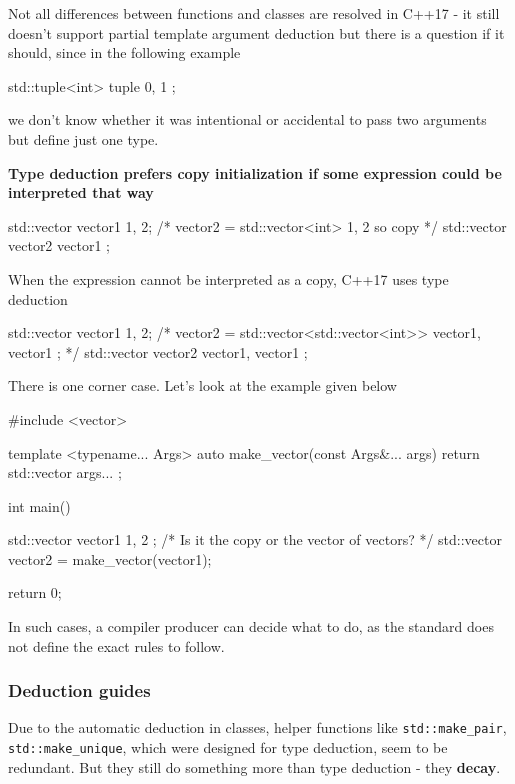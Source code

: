 \documentclass[../main]{subfiles}
\begin{document}
    Not all differences between functions and classes are resolved in C++17 - it still doesn't support partial template argument
deduction but there is a question if it should, since in the following example
\begin{Code}
    std::tuple<int> tuple { 0, 1 };
\end{Code}
we don't know whether it was intentional or accidental to pass two arguments but define just one type.\newline

    \textbf{Type deduction prefers copy initialization if some expression could be interpreted that way}
\begin{Code}
    std::vector vector1 {1, 2};
    /* vector2 = std::vector<int> { 1, 2 } so copy */
    std::vector vector2 { vector1 };
\end{Code}
\noindent
When the expression cannot be interpreted as a copy, C++17 uses type deduction
\begin{Code}
    std::vector vector1 {1, 2};
    /* vector2 = std::vector<std::vector<int>> { vector1, vector1 }; */
    std::vector vector2 { vector1, vector1 };
\end{Code}

    There is one corner case. Let's look at the example given below
\begin{Code}
    #include <vector>
    
    template <typename... Args>
    auto make_vector(const Args&... args)
    {
        return std::vector { args... };
    }
    
    int main()
    {
        std::vector vector1 { 1, 2 };
        /* Is it the copy or the vector of vectors? */
        std::vector vector2 = make_vector(vector1);
    
        return 0;
    }
\end{Code}
In such cases, a compiler producer can decide what to do, as the standard does not define the exact rules to follow.\newline

\subsubsection{Deduction guides}
    Due to the automatic deduction in classes, helper functions like \texttt{std::make\_pair}, \texttt{std::make\_unique}, which were designed for
type deduction, seem to be redundant. But they still do something more than type deduction - they \textbf{decay}.
\end{document}
